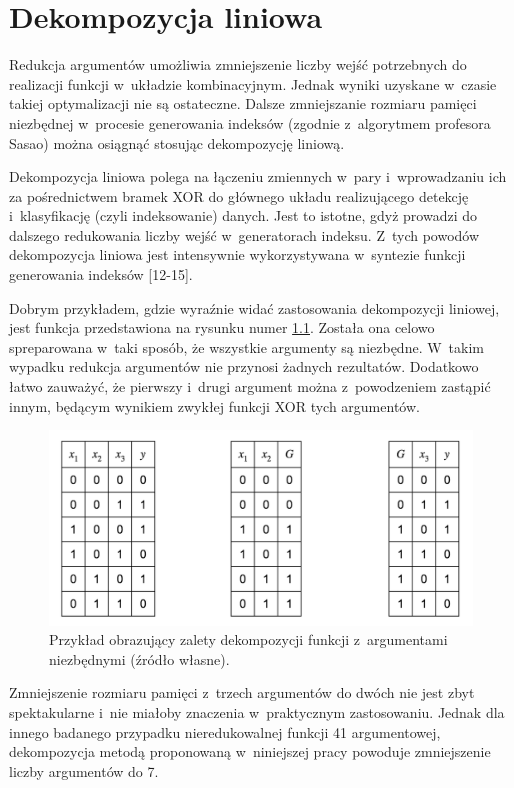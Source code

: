 \chapter{Dekompozycja liniowa}
\label{chapter:decomposition}

Redukcja argumentów umożliwia zmniejszenie liczby wejść potrzebnych do realizacji funkcji w~układzie kombinacyjnym.
Jednak wyniki uzyskane w~czasie takiej optymalizacji nie są ostateczne.
Dalsze zmniejszanie rozmiaru pamięci niezbędnej w~procesie generowania indeksów (zgodnie z~algorytmem profesora Sasao) można osiągnąć stosując dekompozycję liniową.

Dekompozycja liniowa polega na  łączeniu zmiennych w~pary i~wprowadzaniu ich za pośrednictwem bramek XOR do głównego układu realizującego detekcję i~klasyfikację (czyli indeksowanie) danych.
Jest to istotne,
gdyż prowadzi do dalszego redukowania liczby wejść w~generatorach indeksu.
Z~tych powodów dekompozycja liniowa jest intensywnie wykorzystywana w~syntezie funkcji generowania indeksów [12-15].

Dobrym przykładem,
gdzie wyraźnie widać zastosowania dekompozycji liniowej,
jest funkcja przedstawiona na rysunku numer \ref{fig:required-decomposition}.
Została ona celowo spreparowana w~taki sposób,
że wszystkie argumenty są niezbędne.
W~takim wypadku redukcja argumentów nie przynosi żadnych rezultatów.
Dodatkowo łatwo zauważyć,
że pierwszy i~drugi argument można z~powodzeniem zastąpić innym,
będącym wynikiem zwykłej funkcji XOR tych argumentów.

\begin{figure}
\centering
\includegraphics[width = 13cm]{chapter03/required-decomposition.png}
\caption{Przykład obrazujący zalety dekompozycji funkcji z~argumentami niezbędnymi (źródło własne).}
\label{fig:required-decomposition}
\end{figure}

Zmniejszenie rozmiaru pamięci z~trzech argumentów do dwóch nie jest zbyt spektakularne i~nie miałoby znaczenia w~praktycznym zastosowaniu.
Jednak dla innego badanego przypadku nieredukowalnej funkcji 41 argumentowej,
dekompozycja metodą proponowaną w~niniejszej pracy powoduje zmniejszenie liczby argumentów do 7.

